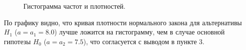 \documentclass[14pt,a4paper]{scrartcl}
\begin{document}
\begin{figure}[h]
	\caption{Гистограмма частот и плотностей.}
	\label{ris:hist_densts}
\end{figure}

По графику видно, что кривая плотности нормального закона для альтернативы $H_1$ ($a=a_1=8.0$) лучше ложится на гистограмму, чем в случае основной гипотезы $H_0$ ($a=a_2=7.5$), что согласуется с выводом в пункте 3.
\end{document}

